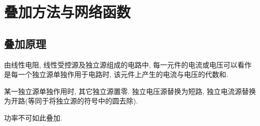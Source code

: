 \documentclass{ctexart}
\begin{document}
\section{叠加方法与网络函数} %
\label{sec:叠加方法与网络函数}

\subsection{叠加原理} %
\label{sub:叠加原理}


由线性电阻, 线性受控源及独立源组成的电路中, 每一元件的电流或电压可以看作是每一个独立源单独作用于电路时, 该元件上产生的电流与电压的代数和.
\par
某一独立源单独作用时, 其它独立源置零. 独立电压源替换为短路, 独立电流源替换为开路(等同于将独立源的符号中的圆去除).
\begin{pitfall}
    功率不可如此叠加.
\end{pitfall}


\end{document}

